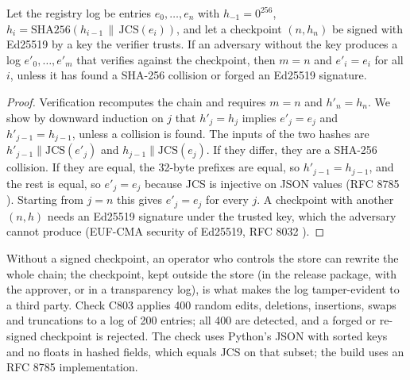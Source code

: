 \setcounter{proposition}{802}
\begin{proposition}\label{prop:govchain}
Let the registry log be entries $e_0,\dots,e_n$ with $h_{-1}=0^{256}$, $h_i=\mathrm{SHA256}(h_{i-1}\,\|\,\mathrm{JCS}(e_i))$, and let a checkpoint $(n,h_n)$ be signed with Ed25519 by a key the verifier trusts. If an adversary without the key produces a log $e'_0,\dots,e'_{m}$ that verifies against the checkpoint, then $m=n$ and $e'_i=e_i$ for all $i$, unless it has found a SHA-256 collision or forged an Ed25519 signature.
\end{proposition}
\begin{proof}
Verification recomputes the chain and requires $m=n$ and $h'_n=h_n$. We show by downward induction on $j$ that $h'_j=h_j$ implies $e'_j=e_j$ and $h'_{j-1}=h_{j-1}$, unless a collision is found. The inputs of the two hashes are $h'_{j-1}\|\mathrm{JCS}(e'_j)$ and $h_{j-1}\|\mathrm{JCS}(e_j)$. If they differ, they are a SHA-256 collision. If they are equal, the 32-byte prefixes are equal, so $h'_{j-1}=h_{j-1}$, and the rest is equal, so $e'_j=e_j$ because JCS is injective on JSON values (RFC 8785 \cite{rfc8785}). Starting from $j=n$ this gives $e'_j=e_j$ for every $j$. A checkpoint with another $(n,h)$ needs an Ed25519 signature under the trusted key, which the adversary cannot produce (EUF-CMA security of Ed25519, RFC 8032 \cite{rfc8032}).
\end{proof}
\noindent Without a signed checkpoint, an operator who controls the store can rewrite the whole chain; the checkpoint, kept outside the store (in the release package, with the approver, or in a transparency log), is what makes the log tamper-evident to a third party. Check C803 applies 400 random edits, deletions, insertions, swaps and truncations to a log of 200 entries; all 400 are detected, and a forged or re-signed checkpoint is rejected. The check uses Python's JSON with sorted keys and no floats in hashed fields, which equals JCS on that subset; the build uses an RFC 8785 implementation.

\setcounter{proposition}{\value{savedpropgov}}
